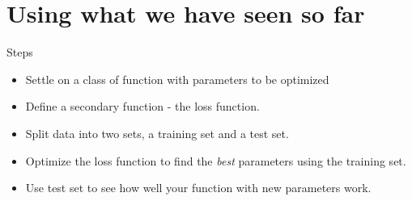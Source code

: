 \section{Using what we have seen so far}
\begin{frame}{Steps}
	\begin{itemize}
		\item Settle on a class of function with parameters  to be optimized
		 
		\item Define a secondary function - the loss function. 
		 
		\item Split data into two sets, a training set and a test set. 
	  
		\item Optimize the loss function  to find the {\it best} parameters using 
		the training set. 
		
		\item Use test set to see how well your function with new parameters work.
	\end{itemize}
\end{frame}